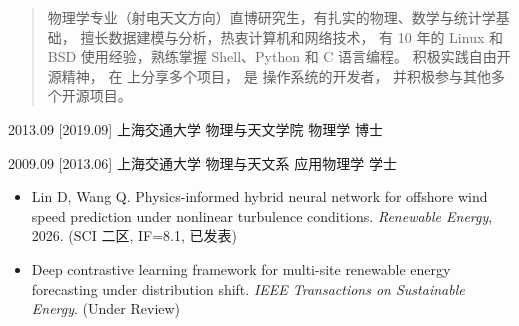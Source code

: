 \documentclass[zh]{resume}
\begin{document}
\makeheader

\begin{abstract}
物理学专业（射电天文方向）直博研究生，有扎实的物理、数学与统计学基础，
擅长数据建模与分析，热衷计算机和网络技术，
有 10 年的 Linux 和 BSD 使用经验，熟练掌握 Shell、Python 和 C 语言编程。
积极实践自由开源精神，
在  上分享多个项目，
是  操作系统的开发者，
并积极参与其他多个开源项目。
\end{abstract}

\begin{educations}
  \education%
    {2013.09}%
    [2019.09]%
    {上海交通大学}%
    {物理与天文学院}%
    {物理学}%
    {博士}

  \separator{0.5ex}
  \education%
    {2009.09}%
    [2013.06]%
    {上海交通大学}%
    {物理与天文系}%
    {应用物理学}%
    {学士}
\end{educations}

\begin{itemize}
\item Lin D, Wang Q. Physics-informed hybrid neural network for offshore wind speed prediction under nonlinear turbulence conditions. \textit{Renewable Energy}, 2026.  (SCI 二区, IF=8.1, 已发表)
\item Deep contrastive learning framework for multi-site renewable energy forecasting under distribution shift. \textit{IEEE Transactions on Sustainable Energy}. (Under Review)
\end{itemize}
\end{document}
